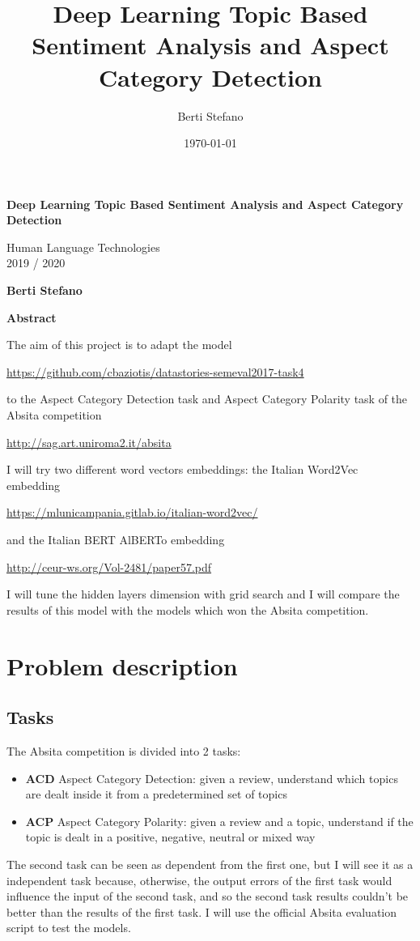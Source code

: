 \documentclass{article}
\title{Deep Learning Topic Based Sentiment Analysis and Aspect Category Detection}
\author{Berti Stefano}
\date{\today}
\begin{document}
    \thispagestyle{plain}
    \begin{center}
        \Large
        \textbf{Deep Learning Topic Based Sentiment Analysis and Aspect Category Detection}

        \vspace{0.4cm}
        \large Human Language Technologies
        \\2019 / 2020

        \vspace{0.4cm}
        \textbf{Berti Stefano}

        \vspace{0.9cm}
        \textbf{Abstract}
    \end{center}
    The aim of this project is to adapt the model
    \\\centerline{\url{https://github.com/cbaziotis/datastories-semeval2017-task4}}
    to the Aspect Category Detection task and Aspect Category Polarity task of the Absita competition
    \\\centerline{\url{http://sag.art.uniroma2.it/absita}}
    I will try two different word vectors embeddings: the Italian Word2Vec embedding
    \\\centerline{\url{https://mlunicampania.gitlab.io/italian-word2vec/}}
    and the Italian BERT AlBERTo embedding
    \\\centerline{\url{http://ceur-ws.org/Vol-2481/paper57.pdf}}
    I will tune the hidden layers dimension with grid search and I will compare the results of this model with the models which won the Absita competition.

    \section{Problem description}\label{sec:s1}
        \subsection{Tasks}\label{subsec:task}
        The Absita competition is divided into 2 tasks:
        \begin{itemize}
            \item \textbf{ACD} Aspect Category Detection: given a review, understand which topics are dealt inside it from a predetermined set of topics
            \item \textbf{ACP} Aspect Category Polarity: given a review and a topic, understand if the topic is dealt in a positive, negative, neutral or mixed way
        \end{itemize}
        The second task can be seen as dependent from the first one, but I will see it as a independent task because, otherwise,
        the output errors of the first task would influence the input of the second task, and so the second task results couldn't be better than the results of the first task.
        I will use the official Absita evaluation script to test the models.
\end{document}
